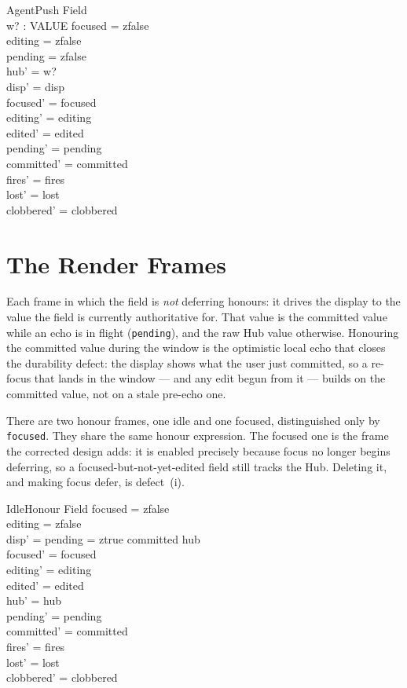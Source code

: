 \documentclass[a4paper,10pt,fleqn]{article}
\begin{document}
\begin{schema}{AgentPush}
  \Delta Field \\
  w? : VALUE
\where
  focused = zfalse \\
  editing = zfalse \\
  pending = zfalse \\
  hub' = w? \\
  disp' = disp \\
  focused' = focused \\
  editing' = editing \\
  edited' = edited \\
  pending' = pending \\
  committed' = committed \\
  fires' = fires \\
  lost' = lost \\
  clobbered' = clobbered
\end{schema}

\section{The Render Frames}
\label{sec:frames}

Each frame in which the field is \emph{not} deferring honours: it drives the
display to the value the field is currently authoritative for.  That value is
the committed value while an echo is in flight (\texttt{pending}), and the raw
Hub value otherwise.  Honouring the committed value during the window is the
optimistic local echo that closes the durability defect: the display shows what
the user just committed, so a re-focus that lands in the window --- and any edit
begun from it --- builds on the committed value, not on a stale pre-echo one.

There are two honour frames, one idle and one focused, distinguished only by
\texttt{focused}.  They share the same honour expression.  The focused one is
the frame the corrected design adds: it is enabled precisely because focus no
longer begins deferring, so a focused-but-not-yet-edited field still tracks the
Hub.  Deleting it, and making focus defer, is defect~(i).

\begin{schema}{IdleHonour}
  \Delta Field
\where
  focused = zfalse \\
  editing = zfalse \\
  disp' = \IF pending = ztrue \THEN committed \ELSE hub \\
  focused' = focused \\
  editing' = editing \\
  edited' = edited \\
  hub' = hub \\
  pending' = pending \\
  committed' = committed \\
  fires' = fires \\
  lost' = lost \\
  clobbered' = clobbered
\end{schema}
\end{document}
